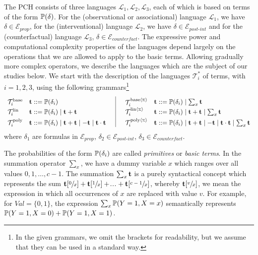 \documentclass[a4paper,UKenglish,cleveref, autoref, thm-restate]{lipics-v2021}
\newcommand{\compactEquals}[1]{\let\IsInPP=1#1\let\IsInPP=\relax}
\newcommand{\PP}[1]{\mathbb{P}(\compactEquals{#1})}
\newcommand{\maxvaluecount}{c}
\newcommand{\cL}{{\mathcal L}}
\newcommand{\cE}{{\mathcal E}}
\newcommand{\cT}{{\mathcal T}}
\newcommand{\bt}{{\bf t}}
\def\Eprop{\cE_{\textit{prop}}}
\def\Epint{\cE_{\textit{post-int}}}
\def\Ecounter{\cE_{\textit{counterfact}}}
\def\probname#1#2{^{\text{#1}}_{\text{#2}}}
\def\probsumname#1#2{^{\text{#1}{\langle{\scriptscriptstyle\Sigma}\rangle}}_{\text{#2}}}
\def\probnamesum#1#2{^{\text{#1}{\langle{\scriptscriptstyle\Sigma}\rangle}}_{\text{#2}}}
\def\Tipolysum{\cT\probnamesum{poly}{$i$}}
\def\Tilinsum{\cT\probsumname{lin}{$i$}}
\def\Ticompsum{\cT\probsumname{base}{$i$}}
\def\Tipoly{\cT\probname{poly}{$i$}}
\def\Tilin{\cT\probname{lin}{$i$}}
\def\Ticomp{\cT\probname{base}{$i$}}
\newcommand\myldots{\!\makebox[1em][c]{.\hfil.\hfil.}}
\begin{document}
The PCH 
consists of three languages 
$\cL_1, \cL_2,\cL_3$, each of which is based on terms of the form $\PP{\delta}$.
For the (observational or associational) language $\cL_1$, we have  $\delta\in \Eprop$,
for the (interventional) language $\cL_2$,  we have $\delta\in \Epint$ and 
for the (counterfactual) language $\cL_3$, $\delta\in \Ecounter$. 
The expressive power and computational complexity properties of the languages depend 
largely on the operations that we are allowed to apply to the basic terms.
Allowing gradually more complex operators, we describe 
the languages which are the subject of our studies below. We start with the description of
the languages $\cT_i^*$ of terms, with $i=1,2,3$, using the following grammars\footnote{In the given grammars, we omit the brackets for readability, but we assume that they can be used in a standard way.}
\[
\begin{array}{ll c|c ll}

    \multirow{1.5}{*}{$\Ticomp$}  & \multirow{1.5}{*}{$\bt::=\PP{\delta_i}$}   &\multirow{1.5}{*}{}&\multirow{1.5}{*}{}&  
        \multirow{1.5}{*}{$\Ticompsum$}  & \multirow{1.5}{*}{$\bt::=\PP{\delta_i}   \mid  \mbox{$\sum_{x} \bt$} $} \\[1.6mm]
    \Tilin  & \bt::=\PP{\delta_i}    \mid \bt +\bt       &&&
    	 \Tilinsum  & \bt::=\PP{\delta_i}   \mid \bt +\bt  \mid  \mbox{$\sum_{x} \bt$} \\[1mm]
   \Tipoly & \bt::=\PP{\delta_i} \mid \bt+\bt  \mid -\bt \mid \bt \cdot \bt &&&
   \Tipolysum &\bt::= \PP{\delta_i} \mid \bt + \bt  \mid -\bt \mid \bt \cdot \bt \mid 
 \mbox{$\sum_{x} \bt$} 
 
   \end{array}
\]
where $\delta_1$ are formulas in $\Eprop$, $\delta_2\in\Epint$, 
$\delta_3\in \Ecounter$.



The probabilities of the form $\PP{\delta_i}$ 
are called \emph{primitives} or \emph{basic terms}.
In the summation operator $\sum_{x}$, we have 
a dummy variable $x$ 
which ranges over all values $0,1,\ldots, \maxvaluecount - 1$.
The summation $\sum_{x} \bt$ is a purely syntactical 
concept which represents the sum 
$\bt[\sfrac{0}{ x}]  +\bt[\sfrac{1}{x}]+\myldots +\bt[\sfrac{\maxvaluecount - 1}{x}]$,
whereby $\bt[\sfrac{v}{x}]$, we mean the expression in which all occurrences of $x$
are replaced with value $v$.
For example,  for  $\mathit{Val} = \{0,1\}$,
the expression
 $\sum_{x} \PP{Y=1, X=x}$
 semantically represents $\PP{Y=1, X=0} + \PP{Y=1, X=1}$.
\end{document}
